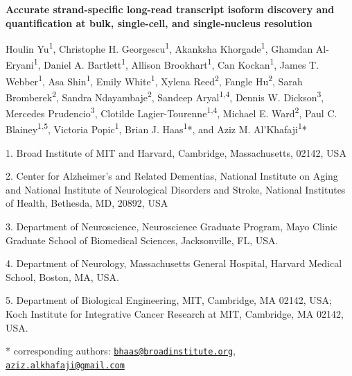 \begin{center}
{\LARGE\bfseries Accurate strand-specific long-read transcript isoform discovery and quantification at bulk, single-cell, and single-nucleus resolution\par}
\end{center}

Houlin Yu\textsuperscript{1}, Christophe H. Georgescu\textsuperscript{1}, Akanksha Khorgade\textsuperscript{1}, Ghamdan Al-Eryani\textsuperscript{1}, Daniel A. Bartlett\textsuperscript{1}, Allison Brookhart\textsuperscript{1}, Can Kockan\textsuperscript{1}, James T. Webber\textsuperscript{1}, Asa Shin\textsuperscript{1}, Emily White\textsuperscript{1}, Xylena Reed\textsuperscript{2}, Fangle Hu\textsuperscript{2}, Sarah Bromberek\textsuperscript{2}, Sandra Ndayambaje\textsuperscript{2}, Sandeep Aryal\textsuperscript{1,4}, Dennis W. Dickson\textsuperscript{3}, Mercedes Prudencio\textsuperscript{3}, Clotilde Lagier-Tourenne\textsuperscript{1,4}, Michael E. Ward\textsuperscript{2}, Paul C. Blainey\textsuperscript{1,5}, Victoria Popic\textsuperscript{1}, Brian J. Haas\textsuperscript{1}*, and Aziz M. Al'Khafaji\textsuperscript{1}*

1. Broad Institute of MIT and Harvard, Cambridge, Massachusetts, 02142, USA

2. Center for Alzheimer's and Related Dementias, National Institute on Aging and National Institute of Neurological Disorders and Stroke, National Institutes of Health, Bethesda, MD, 20892, USA

3. Department of Neuroscience, Neuroscience Graduate Program, Mayo Clinic Graduate School of Biomedical Sciences, Jacksonville, FL, USA.

4. Department of Neurology, Massachusetts General Hospital, Harvard Medical School, Boston, MA, USA.

5. Department of Biological Engineering, MIT, Cambridge, MA 02142, USA; Koch Institute for Integrative Cancer Research at MIT, Cambridge, MA 02142, USA.

* corresponding authors: \href{mailto:bhaas@broadinstitute.org}{\nolinkurl{bhaas@broadinstitute.org}}, \href{mailto:aziz.alkhafaji@gmail.com}{\nolinkurl{aziz.alkhafaji@gmail.com}}
